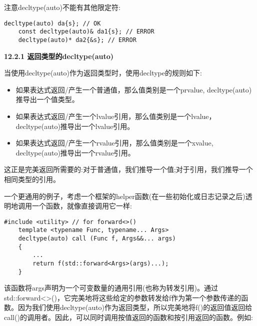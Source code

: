 注意decltype(auto)不能有其他限定符:\par

\begin{lstlisting}[caption={}]
	decltype(auto) da{s}; // OK
	const decltype(auto)& da1{s}; // ERROR
	decltype(auto)* da2{&s}; // ERROR
\end{lstlisting}

\hspace*{\fill} \par %
\textbf{12.2.1 返回类型的decltype(auto)}

当使用decltype(auto)作为返回类型时，使用decltype的规则如下:\par

\begin{itemize}
	\item 如果表达式返回/产生一个普通值，那么值类别是一个prvalue, decltype(auto)推导出一个值类型。
	\item 如果表达式返回/产生一个lvalue引用，那么值类别是一个lvalue，decltype(auto)推导出一个lvalue引用。
	\item 如果表达式返回/产生一个rvalue引用，那么值类别是一个xvalue, decltype(auto)推导出一个rvalue引用。
\end{itemize}

这正是完美返回所需要的:对于普通值，我们推导一个值;对于引用，我们推导一个相同类型的引用。\par

一个更通用的例子，考虑一个框架的helper函数(在一些初始化或日志记录之后)透明地调用一个函数，就像直接调用它一样:\par

{\color{red}{generic/call.hpp}}

\begin{lstlisting}[caption={}]
	#include <utility> // for forward<>()
	template <typename Func, typename... Args>
	decltype(auto) call (Func f, Args&&... args)
	{
		...
		return f(std::forward<Args>(args)...);
	}
\end{lstlisting}

该函数将args声明为一个可变数量的通用引用(也称为转发引用)。通过std::forward<>()，它完美地将这些给定的参数转发给f作为第一个参数传递的函数。因为我们使用decltype(auto)作为返回类型，所以完美地将f()的返回值返回给call()的调用者。因此，可以同时调用按值返回的函数和按引用返回的函数。例如:\par

{\color{red}{generic/call.cpp}}

